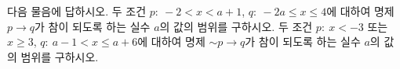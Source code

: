 다음 물음에 답하시오.
 두 조건 $p:\ -2<x<a+1$, $q:\ -2a\le x\le 4$에 대하여 명제 $p\longrightarrow q$가 참이 되도록 하는 실수 $a$의 값의 범위를 구하시오.
 두 조건 $p:\ x<-3$ 또는 $x\ge 3$, $q:\ a-1<x\le a+6$에 대하여 명제 $\sim p\longrightarrow q$가 참이 되도록 하는 실수 $a$의 값의 범위를 구하시오.
